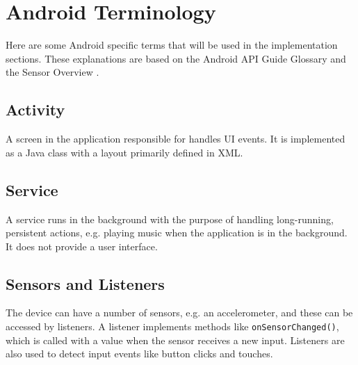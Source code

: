 \section{Android Terminology}
Here are some Android specific terms that will be used in the implementation sections. These explanations are based on the Android API Guide Glossary \citep{android:terms} and the Sensor Overview \citep{android:sensor}.

\subsection*{Activity}
A screen in the application responsible for handles UI events. It is implemented as a Java class with a layout primarily defined in XML.


\subsection*{Service}
A service runs in the background with the purpose of handling long-running, persistent actions, e.g. playing music when the application is in the background. It does not provide a user interface.

\subsection*{Sensors and Listeners}
The device can have a number of sensors, e.g. an accelerometer, and these can be accessed by listeners. A listener implements methods like \texttt{onSensorChanged()}, which is called with a value when the sensor receives a new input. Listeners are also used to detect input events like button clicks and touches.
